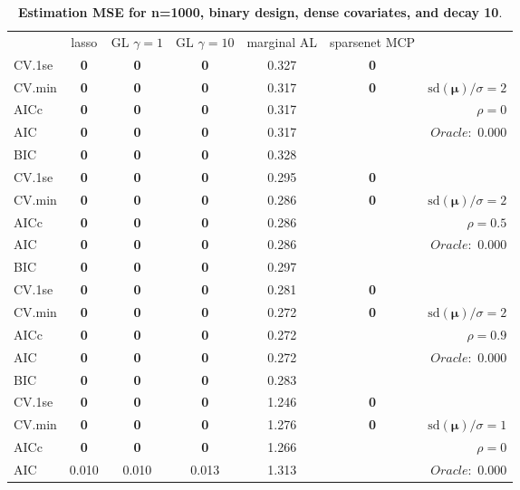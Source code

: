 \clearpage
\begin{table}\vspace{-.5cm}
\caption[l]{ { \bf Estimation MSE for n=1000, binary design, 
dense covariates, and  decay  10}.}
\vspace{-.5cm}
\footnotesize{}
\begin{center}
\begin{tabular}{l*{5}{c}|r}
& lasso & GL $\gamma=1$ & GL $\gamma=10$ & marginal AL & sparsenet MCP  & \\
 \cline{1-7}
CV.1se & {\bf 0} & {\bf 0} & {\bf 0} & 0.327 & {\bf 0} & \\
CV.min & {\bf 0} & {\bf 0} & {\bf 0} & 0.317 & {\bf 0} &  $\mathrm{sd}(\mathbf{\mu})/\sigma=2$ \\
AICc & {\bf 0} & {\bf 0} & {\bf 0} & 0.317 & & $\rho=0$ \\
AIC & {\bf 0} & {\bf 0} & {\bf 0} & 0.317 & &  \multirow{2}{*}{$Oracle: $ 0.000} \\
BIC & {\bf 0} & {\bf 0} & {\bf 0} & 0.328 & &  \\
 \hline 
CV.1se & {\bf 0} & {\bf 0} & {\bf 0} & 0.295 & {\bf 0} & \\
CV.min & {\bf 0} & {\bf 0} & {\bf 0} & 0.286 & {\bf 0} &  $\mathrm{sd}(\mathbf{\mu})/\sigma=2$ \\
AICc & {\bf 0} & {\bf 0} & {\bf 0} & 0.286 & & $\rho=0.5$ \\
AIC & {\bf 0} & {\bf 0} & {\bf 0} & 0.286 & &  \multirow{2}{*}{$Oracle: $ 0.000} \\
BIC & {\bf 0} & {\bf 0} & {\bf 0} & 0.297 & &  \\
 \hline 
CV.1se & {\bf 0} & {\bf 0} & {\bf 0} & 0.281 & {\bf 0} & \\
CV.min & {\bf 0} & {\bf 0} & {\bf 0} & 0.272 & {\bf 0} &  $\mathrm{sd}(\mathbf{\mu})/\sigma=2$ \\
AICc & {\bf 0} & {\bf 0} & {\bf 0} & 0.272 & & $\rho=0.9$ \\
AIC & {\bf 0} & {\bf 0} & {\bf 0} & 0.272 & &  \multirow{2}{*}{$Oracle: $ 0.000} \\
BIC & {\bf 0} & {\bf 0} & {\bf 0} & 0.283 & &  \\
 \hline 
CV.1se & {\bf 0} & {\bf 0} & {\bf 0} & 1.246 & {\bf 0} & \\
CV.min & {\bf 0} & {\bf 0} & {\bf 0} & 1.276 & {\bf 0} &  $\mathrm{sd}(\mathbf{\mu})/\sigma=1$ \\
AICc & {\bf 0} & {\bf 0} & {\bf 0} & 1.266 & & $\rho=0$ \\
AIC & 0.010 & 0.010 & 0.013 & 1.313 & &  \multirow{2}{*}{$Oracle: $ 0.000} \\

\end{tabular}
\end{center}
\end{table}
